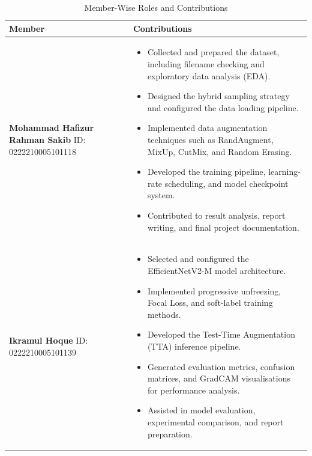 \documentclass[12pt,a4paper]{article}
\begin{document}
\begin{table}[H]
\centering
\caption{Member-Wise Roles and Contributions}
\label{tab:team}
\begin{tabular}{|p{4.8cm}|p{9.0cm}|}
    \hline
    \textbf{Member} & \textbf{Contributions} \\
    \hline
    \textbf{Mohammad Hafizur Rahman Sakib} \newline ID: 0222210005101118 &
    \begin{itemize}[noitemsep, topsep=2pt, leftmargin=*]
        \item Collected and prepared the dataset, including filename checking and exploratory data analysis (EDA).
        \item Designed the hybrid sampling strategy and configured the data loading pipeline.
        \item Implemented data augmentation techniques such as RandAugment, MixUp, CutMix, and Random Erasing.
        \item Developed the training pipeline, learning-rate scheduling, and model checkpoint system.
        \item Contributed to result analysis, report writing, and final project documentation.
    \end{itemize} \\
    \hline
    \textbf{Ikramul Hoque} \newline ID: 0222210005101139 &
    \begin{itemize}[noitemsep, topsep=2pt, leftmargin=*]
        \item Selected and configured the EfficientNetV2-M model architecture.
        \item Implemented progressive unfreezing, Focal Loss, and soft-label training methods.
        \item Developed the Test-Time Augmentation (TTA) inference pipeline.
        \item Generated evaluation metrics, confusion matrices, and GradCAM visualisations for performance analysis.
        \item Assisted in model evaluation, experimental comparison, and report preparation.
    \end{itemize} \\
    \hline
\end{tabular}
\end{table}

\newpage
\end{document}
